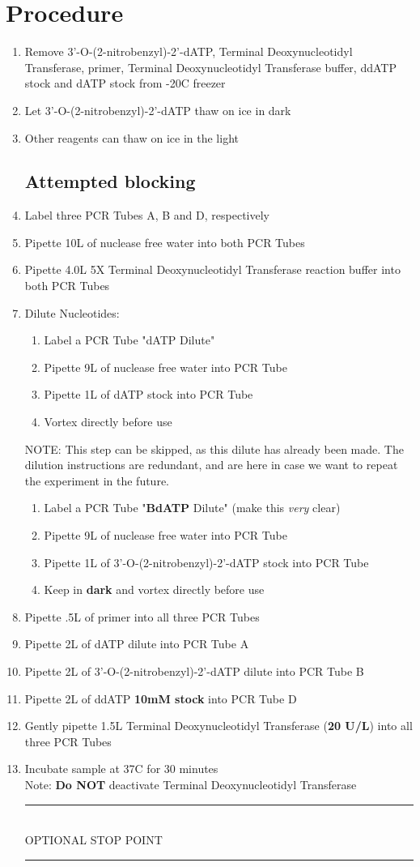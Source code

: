 \documentclass[letterpaper]{article}
\newcommand{\tdt}{Terminal Deoxynucleotidyl Transferase}
\newcommand{\C}{\degree{}C}
\newcommand{\uL}{\micro{}L}
\newcommand{\BdATP}{3'-O-(2-nitrobenzyl)-2'-dATP}
\newcommand{\stopPoint}{\begin{center}
\rule{0.5\textwidth}{.4pt}\\
\vspace{1mm} 
OPTIONAL STOP POINT\\
\rule{0.5\textwidth}{.4pt}
\end{center}}
\begin{document}
\section{Procedure}%
\begin{enumerate} 
\subsection{Sample Preparation}
\item{Remove \BdATP{}, \tdt{}, primer, \tdt{}  buffer, ddATP stock and dATP stock from -20\C{} freezer}
\item{Let \BdATP{} thaw on ice in dark}
\item{Other reagents can thaw on ice in the light}
\subsection{Attempted blocking}
\item{Label three PCR Tubes A, B and D, respectively}
\item{Pipette 10\uL{} of nuclease free water into both PCR Tubes}
\item{Pipette 4.0\uL{} 5X \tdt{} reaction buffer into both PCR Tubes}
\item{Dilute Nucleotides:
\begin{enumerate}
\item{Label a PCR Tube "dATP Dilute"}
\item{Pipette 9\uL{} of nuclease free water into PCR Tube}
\item{Pipette 1\uL{} of dATP stock into PCR Tube}
\item{Vortex directly before use}
\end{enumerate}
NOTE: This step can be skipped, as this dilute has already been made. The dilution instructions are redundant, and are here in case we want to repeat the experiment in the future.
\begin{enumerate}
\item{Label a PCR Tube "\textbf{BdATP} Dilute" (make this \textit{very} clear)}
\item{Pipette 9\uL{} of nuclease free water into PCR Tube}
\item{Pipette 1\uL{} of \BdATP{} stock into PCR Tube}
\item{Keep in \textbf{dark} and vortex directly before use}
\end{enumerate}
}
\item{Pipette .5\uL{} of primer into all three PCR Tubes}
\item{Pipette 2\uL{} of dATP dilute into PCR Tube A}
\item{Pipette 2\uL{} of \BdATP{} dilute into PCR Tube B}
\item{Pipette 2\uL{} of ddATP \textbf{10mM stock} into PCR Tube D}
\item{Gently pipette 1.5\uL{} \tdt{} (\textbf{20 U/\uL{}}) into all three PCR Tubes}
\item{Incubate sample at 37\C{} for 30 minutes}\\
Note: \textbf{Do NOT} deactivate \tdt{} 
\stopPoint{} 

\end{enumerate}
\end{document}

